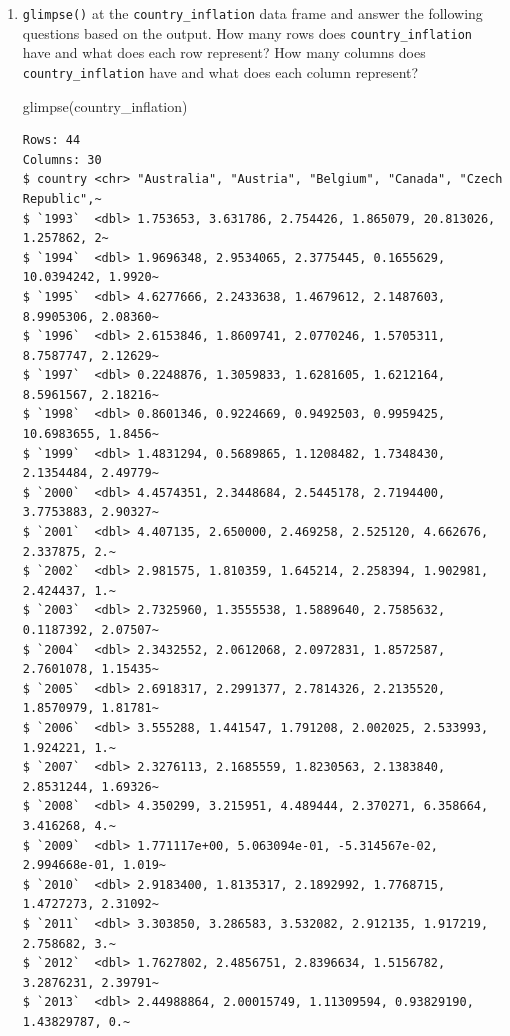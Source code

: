 \documentclass[
  letterpaper,
  DIV=11,
  numbers=noendperiod]{scrartcl}
\newenvironment{Shaded}{\begin{snugshade}}{\end{snugshade}}
\newcommand{\FunctionTok}[1]{\textcolor[rgb]{0.28,0.35,0.67}{#1}}
\newcommand{\NormalTok}[1]{\textcolor[rgb]{0.00,0.23,0.31}{#1}}
\begin{document}
\begin{enumerate}
\def\labelenumi{\alph{enumi}.}
\item
  \texttt{glimpse()} at the \texttt{country\_inflation} data frame and
  answer the following questions based on the output. How many rows does
  \texttt{country\_inflation} have and what does each row represent? How
  many columns does \texttt{country\_inflation} have and what does each
  column represent?

\begin{Shaded}
\begin{Highlighting}[]
\FunctionTok{glimpse}\NormalTok{(country\_inflation)}
\end{Highlighting}
\end{Shaded}

\begin{verbatim}
Rows: 44
Columns: 30
$ country <chr> "Australia", "Austria", "Belgium", "Canada", "Czech Republic",~
$ `1993`  <dbl> 1.753653, 3.631786, 2.754426, 1.865079, 20.813026, 1.257862, 2~
$ `1994`  <dbl> 1.9696348, 2.9534065, 2.3775445, 0.1655629, 10.0394242, 1.9920~
$ `1995`  <dbl> 4.6277666, 2.2433638, 1.4679612, 2.1487603, 8.9905306, 2.08360~
$ `1996`  <dbl> 2.6153846, 1.8609741, 2.0770246, 1.5705311, 8.7587747, 2.12629~
$ `1997`  <dbl> 0.2248876, 1.3059833, 1.6281605, 1.6212164, 8.5961567, 2.18216~
$ `1998`  <dbl> 0.8601346, 0.9224669, 0.9492503, 0.9959425, 10.6983655, 1.8456~
$ `1999`  <dbl> 1.4831294, 0.5689865, 1.1208482, 1.7348430, 2.1354484, 2.49779~
$ `2000`  <dbl> 4.4574351, 2.3448684, 2.5445178, 2.7194400, 3.7753883, 2.90327~
$ `2001`  <dbl> 4.407135, 2.650000, 2.469258, 2.525120, 4.662676, 2.337875, 2.~
$ `2002`  <dbl> 2.981575, 1.810359, 1.645214, 2.258394, 1.902981, 2.424437, 1.~
$ `2003`  <dbl> 2.7325960, 1.3555538, 1.5889640, 2.7585632, 0.1187392, 2.07507~
$ `2004`  <dbl> 2.3432552, 2.0612068, 2.0972831, 1.8572587, 2.7601078, 1.15435~
$ `2005`  <dbl> 2.6918317, 2.2991377, 2.7814326, 2.2135520, 1.8570979, 1.81781~
$ `2006`  <dbl> 3.555288, 1.441547, 1.791208, 2.002025, 2.533993, 1.924221, 1.~
$ `2007`  <dbl> 2.3276113, 2.1685559, 1.8230563, 2.1383840, 2.8531244, 1.69326~
$ `2008`  <dbl> 4.350299, 3.215951, 4.489444, 2.370271, 6.358664, 3.416268, 4.~
$ `2009`  <dbl> 1.771117e+00, 5.063094e-01, -5.314567e-02, 2.994668e-01, 1.019~
$ `2010`  <dbl> 2.9183400, 1.8135317, 2.1892992, 1.7768715, 1.4727273, 2.31092~
$ `2011`  <dbl> 3.303850, 3.286583, 3.532082, 2.912135, 1.917219, 2.758682, 3.~
$ `2012`  <dbl> 1.7627802, 2.4856751, 2.8396634, 1.5156782, 3.2876231, 2.39791~
$ `2013`  <dbl> 2.44988864, 2.00015749, 1.11309594, 0.93829190, 1.43829787, 0.~

\end{verbatim}
\end{enumerate}
\end{document}
